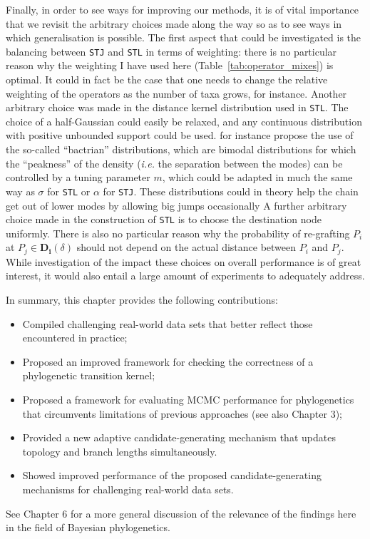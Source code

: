 Finally, in order to see ways for improving our methods, it is of vital importance that we revisit the arbitrary choices made along the way so as to see ways in which generalisation is possible.
The first aspect that could be investigated is the balancing between \verb|STJ| and \verb|STL| in terms of weighting: there is no particular reason why the weighting I have used here (Table~\ref{tab:operator_mixes}) is optimal.
It could in fact be the case that one needs to change the relative weighting of the operators as the number of taxa grows, for instance.
Another arbitrary choice was made in the distance kernel distribution used in \verb|STL|.
The choice of a half-Gaussian could easily be relaxed, and any continuous distribution with positive unbounded support could be used.
\cite{Yang2013} for instance propose the use of the so-called ``bactrian'' distributions, which are bimodal distributions for which the ``peakness'' of the density (\textit{i.e.} the separation between the modes) can be controlled by a tuning parameter $m$, which could be adapted in much the same way as $\sigma$ for \verb|STL| or $\alpha$ for \verb|STJ|.
These distributions could in theory help the chain get out of lower modes by allowing big jumps occasionally
A further arbitrary choice made in the construction of \verb|STL| is to choose the destination node uniformly.
There is also no particular reason why the probability of re-grafting $P_i$ at $P_j \in \mathbf{D_i}(\delta)$ should not depend on the actual distance between $P_i$ and $P_j$.
While investigation of the impact these choices on overall performance is of great interest, it would also entail a large amount of experiments to adequately address.

In summary, this chapter provides the following contributions:
\begin{itemize}
 \item Compiled challenging real-world data sets that better reflect those encountered in practice; 
 \item Proposed an improved framework for checking the correctness of a phylogenetic transition kernel;
 \item Proposed a framework for evaluating MCMC performance for phylogenetics that circumvents limitations of previous approaches (see also Chapter 3);
 \item Provided a new adaptive candidate-generating mechanism that updates topology and branch lengths simultaneously.
 \item Showed improved performance of the proposed candidate-generating mechanisms for challenging real-world data sets.
\end{itemize}

See Chapter 6 for a more general discussion of the relevance of the findings here in the field of Bayesian phylogenetics.

% 
